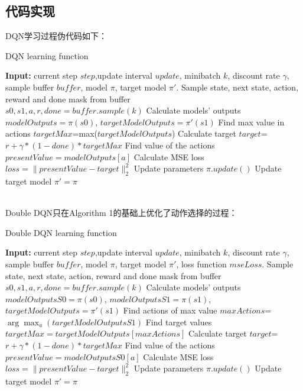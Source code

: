 \documentclass[a4paper,12pt]{article}
\begin{document}
\begin{CJK}{UTF8}{gbsn}
\subsection{代码实现}
\noindent DQN学习过程伪代码如下：
\begin{algorithm}[!h]
	\caption{DQN learning function}
	\begin{algorithmic}[1]
		\STATE \textbf{Input:} current step $step$,update interval $update$, minibatch $k$, discount rate $\gamma$, sample buffer $buffer$, model $\pi$, target model $\pi'$.
		\STATE Sample state, next state, action, reward and done mask from buffer \\$s0, s1, a, r, done =buffer.sample(k)$
		\STATE Calculate models' outputs $modelOutputs=\pi(s0)$, $targetModelOutputs=\pi'(s1)$
		\STATE Find max value in actions $targetMax$=max($targetModelOutputs$)
		\STATE Calculate target $target$=$r + \gamma*(1-done)*targetMax$
		\STATE Find value of the actions $presentValue=modelOutputs[a]$
		\STATE Calculate MSE loss $loss=\|presentValue-target\|_2^2$
		\STATE Update parameters $\pi.update()$
		\STATE Update target model $\pi'=\pi$
		\ENDIF
	\end{algorithmic}
\end{algorithm}
\\
\noindent Double DQN只在Algorithm 1的基础上优化了动作选择的过程：
\begin{algorithm}[!h]
	\caption{Double DQN learning function}
	\begin{algorithmic}[1]
		\STATE \textbf{Input:} current step $step$,update interval $update$, minibatch $k$, discount rate $\gamma$, sample buffer $buffer$, model $\pi$, target model $\pi'$, loss function $mseLoss$.
		\STATE Sample state, next state, action, reward and done mask from buffer \\$s0, s1, a, r, done =buffer.sample(k)$
		\STATE Calculate models' outputs $modelOutputsS0=\pi(s0)$, $modelOutputsS1=\pi(s1)$, $targetModelOutputs=\pi'(s1)$
		\STATE Find actions of max value $maxActions$=$\arg\max_a (targetModelOutputsS1)$
		\STATE Find target values $targetMax=targetModelOutputs[maxActions]$
		\STATE Calculate target $target$=$r + \gamma*(1-done)*targetMax$
		\STATE Find value of the actions $presentValue=modelOutputsS0[a]$
		\STATE Calculate MSE loss $loss=\|presentValue-target\|_2^2$
		\STATE Update parameters $\pi.update()$
		\STATE Update target model $\pi'=\pi$
		\ENDIF
	\end{algorithmic}
\end{algorithm}

\end{CJK}
\end{document}
